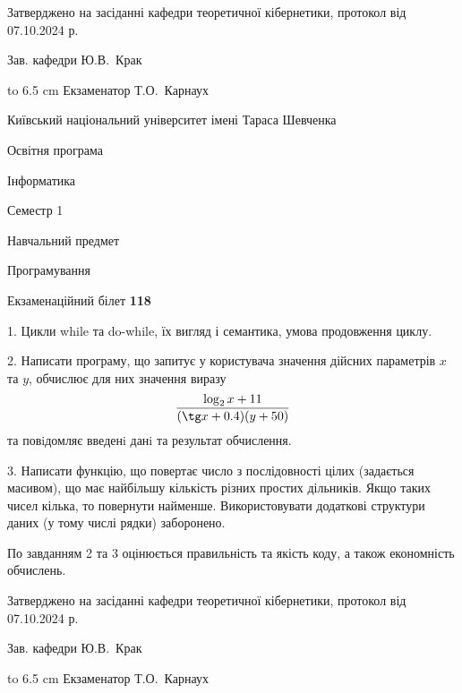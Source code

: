 \documentclass[12pt, ukrainian]{article}
\begin{document}
{\smallskip\smallskip \begin {scriptsize} Затверджено на засіданні кафедри теоретичної кібернетики, протокол   від   07.10.2024 р.\par\smallskip\smallskip\smallskip\smallskip
{\parbox {6.5 cm} {Зав. кафедри \dotfill Ю.В.~Крак}}\hspace {0.7cm} {\hbox to 6.5 cm { Екзаменатор \dotfill Т.О.~Карнаух}} \end{scriptsize}}
\newpage
{{\begin {scriptsize}\par
{ \center  Київський національний університет імені Тараса Шевченка \par}
{\parbox {5 cm}{Освітня програма \hfill}{\parbox {7 cm}{Інформатика\hfill}}\parbox {6 cm}{\hfill Семестр 1}}\par
{\parbox {5 cm} {Навчальний предмет \hfill}\parbox {7 cm}{Програмування \hfill}\parbox {6cm}{\hfill}\par}\vspace{-15pt} \end{scriptsize}}{\center Екзаменаційний білет \No \textbf { 118 }\par}}
{%
1. Цикли while та do-while, їх вигляд і семантика, умова продовження циклу.%
\par
2. Написати програму, що запитує у користувача значення дійсних параметрів $x$ та $y$, обчислює для них значення виразу 
$$\frac{\log_{2} x + 11}{(\tg x + 0.4) (y + 50)}$$ 
та повiдомляє введенi данi та результат обчислення.

\par
3. Написати функцію, що повертає число з послідовності цілих (задається масивом), що має найбільшу кількість різних простих дільників. Якщо таких чисел кілька, то повернути найменше. Використовувати додаткові структури даних (у тому числі рядки) заборонено.

По завданням 2 та 3 оцінюється правильність та якість коду, а також економність обчислень.

}
{\smallskip\smallskip \begin {scriptsize} Затверджено на засіданні кафедри теоретичної кібернетики, протокол   від   07.10.2024 р.\par\smallskip\smallskip\smallskip\smallskip
{\parbox {6.5 cm} {Зав. кафедри \dotfill Ю.В.~Крак}}\hspace {0.7cm} {\hbox to 6.5 cm { Екзаменатор \dotfill Т.О.~Карнаух}} \end{scriptsize}}
\vspace{0.9cm}
\end{document}
